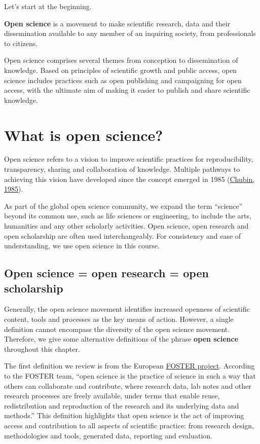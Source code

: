 \documentclass[
]{book}
\begin{document}
Let's start at the beginning.

\textbf{Open science} is a movement to make scientific research, data and their dissemination available to any member of an inquiring society, from professionals to citizens.

Open science comprises several themes from conception to dissemination of knowledge. Based on principles of scientific growth and public access, open science includes practices such as open publishing and campaigning for open access, with the ultimate aim of making it easier to publish and share scientific knowledge.

\hypertarget{what-is-open-science}{%
\section{What is open science?}\label{what-is-open-science}}

Open science refers to a vision to improve scientific practices for reproducibility, transparency, sharing and collaboration of knowledge. Multiple pathways to achieving this vision have developed since the concept emerged in 1985 (\href{https://journals.sagepub.com/doi/10.1177/016224398501000211}{Chubin, 1985}).

As part of the global open science community, we expand the term ``science'' beyond its common use, such as life sciences or engineering, to include the arts, humanities and any other scholarly activities. Open science, open research and open scholarship are often used interchangeably. For consistency and ease of understanding, we use open science in this course.

\hypertarget{open-science-open-research-open-scholarship}{%
\subsection{Open science = open research = open scholarship}\label{open-science-open-research-open-scholarship}}

Generally, the open science movement identifies increased openness of scientific content, tools and processes as the key means of action. However, a single definition cannot encompass the diversity of the open science movement. Therefore, we give some alternative definitions of the phrase \textbf{open science} throughout this chapter.

The first definition we review is from the European \href{https://www.fosteropenscience.eu/}{FOSTER project}. According to the FOSTER team, ``open science is the practice of science in such a way that others can collaborate and contribute, where research data, lab notes and other research processes are freely available, under terms that enable reuse, redistribution and reproduction of the research and its underlying data and methods.'' This definition highlights that open science is the act of improving access and contribution to all aspects of scientific practice: from research design, methodologies and tools, generated data, reporting and evaluation.
\end{document}
